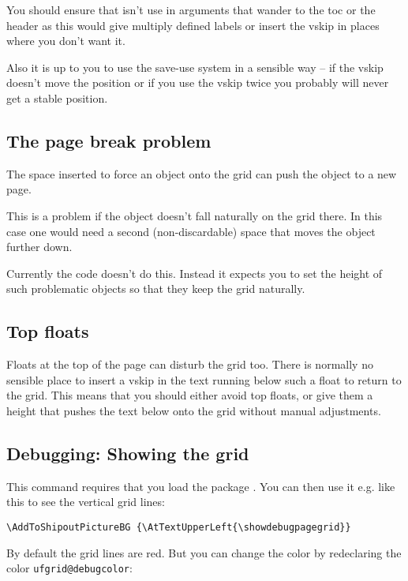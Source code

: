 \documentclass[twoside,parskip=half-,fontsize=12pt,egregdoesnotlikesansseriftitles,headings=normal]{scrartcl}
\begin{document}
You should ensure that  isn't use in arguments that wander to the toc or the header as this would give multiply defined labels or insert the vskip in places where you don't want it.

Also it is up to you to use the save-use system in a sensible way -- if the vskip doesn't move the position or if you use the vskip twice you probably will never get a stable position.

\subsection{The page break problem}\label{sec:pagebreak}

The space inserted to force an object onto the grid can push the object to a new page.

This is a problem if the object doesn't fall naturally on the grid there. In this case one would need a second (non-discardable) space that moves the object further down.

Currently the code doesn't do this. Instead it expects you to set the height of such problematic objects so that they keep the grid naturally.


\subsection{Top floats}

Floats at the top of the page can disturb the grid too.  There is normally no sensible place to insert a vskip in the text running below such a float to return to the grid. This means that you should either avoid top floats, or give them a height that pushes the text below onto the grid without manual adjustments.

\subsection{Debugging: Showing the grid}

\DescribeMacro\showdebugpagegrid

This command requires that you load the package . You can then use it e.g. like this to see the vertical grid lines:

\begin{lstlisting}
\AddToShipoutPictureBG {\AtTextUpperLeft{\showdebugpagegrid}}
\end{lstlisting}

By default the grid lines are red. But you can change the color by redeclaring the color \texttt{ufgrid@debugcolor}:
\end{document}
